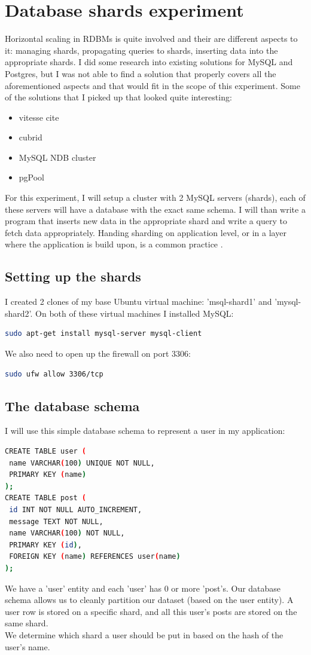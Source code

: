 \documentclass[12pt]{report}
\begin{document}
\section{Database shards experiment}
Horizontal scaling in RDBMs is quite involved and their are different
aspects to it: managing shards, propagating queries to shards,
inserting data into the appropriate shards.
I did some research into existing solutions for MySQL and Postgres, but
I was not able to find a solution that properly covers all the
aforementioned aspects and that would fit in the scope of this
experiment.
Some of the solutions that I picked up that looked quite interesting:
\begin{itemize}
\item vitesse cite
\item cubrid
\item MySQL NDB cluster
\item pgPool
\end{itemize}

For this experiment, I will setup a cluster with 2 MySQL servers (shards), each
of these servers will have a database with the exact same schema. I will
than write a program that inserts new data in the appropriate shard
and write a query to fetch data appropriately.
Handing sharding on application level, or in a layer where the
application is build upon, is a common practice
\cite{tumblr_sharding}. 

\subsection{Setting up the shards}
I created 2 clones of my base Ubuntu virtual machine: 'msql-shard1'
and 'mysql-shard2'. 
On both of these virtual machines I installed MySQL:
\begin{lstlisting}[language=bash]
sudo apt-get install mysql-server mysql-client
\end{lstlisting}

We also need to open up the firewall on port 3306:
\begin{lstlisting}[language=bash]
sudo ufw allow 3306/tcp
\end{lstlisting}

\subsection{The database schema}
I will use this simple database schema to represent a user in my
application:
\begin{lstlisting}[language=bash]
CREATE TABLE user (
 name VARCHAR(100) UNIQUE NOT NULL, 
 PRIMARY KEY (name)
);
CREATE TABLE post (
 id INT NOT NULL AUTO_INCREMENT,
 message TEXT NOT NULL,
 name VARCHAR(100) NOT NULL,
 PRIMARY KEY (id),
 FOREIGN KEY (name) REFERENCES user(name)
);
\end{lstlisting}
We have a 'user' entity and each 'user' has 0 or more 'post's. Our
database schema allows us to cleanly partition our dataset (based on
the user entity). A user row is stored on a specific shard, and all
this user's posts are stored on the same shard.\\
We determine which shard a user should be put in based on the hash of
the user's name.
\end{document}
